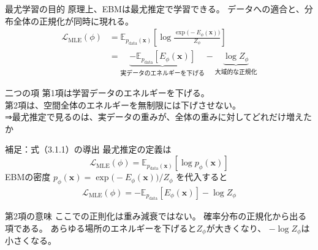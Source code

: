 \begin{frame}{最尤学習の目的}
    原理上、EBMは最尤推定で学習できる。
    データへの適合と、分布全体の正規化が同時に現れる。
    \[
        \begin{aligned}
        \mathcal{L}_{\mathrm{MLE}}(\phi)
        &=
        \mathbb{E}_{p_{\mathrm{data}}(\bm{x})}
        \left[
        \log
        \frac{\exp\!\bigl(-E_\phi(\bm{x})\bigr)}{Z_\phi}
        \right]\\
        &=
        \underbrace{
        -\mathbb{E}_{p_{\mathrm{data}}}[E_\phi(\bm{x})]
        }_{\text{実データのエネルギーを下げる}}
        -
        \underbrace{\log Z_\phi}_{\text{大域的な正規化}}
        \end{aligned}
        \tag{3.1.1}
\]
    \begin{block}{二つの項}
        第1項は学習データのエネルギーを下げる。\\
        第2項は、空間全体のエネルギーを無制限には下げさせない。\\
        ⇒最尤推定で見るのは、実データの重みが、全体の重みに対してどれだけ増えたか
    \end{block}
\end{frame}
\assuppl
\begin{frame}{補足：式（3.1.1）の導出}
    最尤推定の定義は
    \[
        \mathcal{L}_{\mathrm{MLE}}(\phi)
        =
        \mathbb{E}_{p_{\mathrm{data}}(\bm{x})}
        [\log p_\phi(\bm{x})]
    \]
    EBMの密度
    $p_\phi(\bm{x})=\exp\!\bigl(-E_\phi(\bm{x})\bigr)/Z_\phi$
    を代入すると
    \[
        \begin{aligned}
        \mathcal{L}_{\mathrm{MLE}}(\phi)
        =
        -\mathbb{E}_{p_{\mathrm{data}}}[E_\phi(\bm{x})]
        -\log Z_\phi
        \end{aligned}
    \]
    \begin{exampleblock}{第2項の意味}
        ここでの正則化は重み減衰ではない。
        確率分布の正規化から出る項である。
        あらゆる場所のエネルギーを下げると$Z_\phi$が大きくなり、
        $-\log Z_\phi$は小さくなる。
    \end{exampleblock}
\end{frame}
\assuppl
